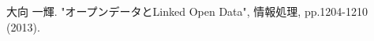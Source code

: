 \begin{thebibliography}{99}
	 大向 一輝. "オープンデータとLinked Open Data", 情報処理, pp.1204-1210 (2013).
\end{thebibliography}
